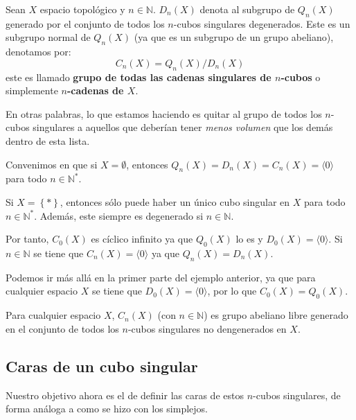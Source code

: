 \documentclass[12pt]{report}
\newcounter{it}
\theoremstyle{largebreak}
\newcommand\gen[1]{\ensuremath{\langle#1\rangle }}
\begin{document}
    \begin{mydef}
        Sean $X$ espacio topológico y $n\in\mathbb{N}$. $D_n(X)$ denota al subgrupo de $Q_n(X)$ generado por el conjunto de todos los $n$-cubos singulares degenerados. Este es un subgrupo normal de $Q_n(X)$ (ya que es un subgrupo de un grupo abeliano), denotamos por:
        \begin{equation*}
            C_n(X)=Q_n(X)/D_n(X)
        \end{equation*}
        este es llamado \textbf{grupo de todas las cadenas singulares de $n$-cubos} o simplemente \textbf{$n$-cadenas de $X$}.
    \end{mydef}

    En otras palabras, lo que estamos haciendo es quitar al grupo de todos los $n$-cubos singulares a aquellos que deberían tener \textit{menos volumen} que los demás dentro de esta lista.

    Convenimos en que si $X=\emptyset$, entonces $Q_n(X)=D_n(X)=C_n(X)=\langle0\rangle$ para todo $n\in\mathbb{N}^*$.

    \begin{exa}
        Si $X=\left\{*\right\}$, entonces sólo puede haber un único cubo singular en $X$ para todo $n\in\mathbb{N}^*$. Además, este siempre es degenerado si $n\in\mathbb{N}$.

        Por tanto, $C_0(X)$ es cíclico infinito ya que $Q_0(X)$ lo es y $D_0(X)=\gen{0}$. Si $n\in\mathbb{N}$ se tiene que $C_n(X)=\gen{0}$ ya que $Q_n(X)=D_n(X)$.
    \end{exa}

    \begin{exa}
        Podemos ir más allá en la primer parte del ejemplo anterior, ya que para cualquier espacio $X$ se tiene que $D_0(X)=\gen{0}$, por lo que $C_0(X)=Q_0(X)$.
    \end{exa}

    \begin{exa}
        Para cualquier espacio $X$, $C_n(X)$ (con $n\in\mathbb{N}$) es grupo abeliano libre generado en el conjunto de todos los $n$-cubos singulares no dengenerados en $X$.
    \end{exa}

    \subsection{Caras de un cubo singular}

    Nuestro objetivo ahora es el de definir las caras de estos $n$-cubos singulares, de forma análoga a como se hizo con los simplejos.
\end{document}
